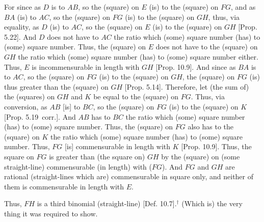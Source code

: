 \begin{Parallel}{}{}
{For since as $D$ is to $AB$, so the (square) on $E$ (is) to the (square)
on $FG$, and as $BA$ (is) to $AC$, so the (square) on $FG$ (is) to
the (square) on $GH$, thus, via equality, as $D$ (is) to $AC$, so the
(square) on $E$ (is) to the (square) on $GH$ [Prop. 5.22]. And $D$ does not have to $AC$ the
ratio which (some) square number (has) to (some) square number.
Thus, the (square) on $E$ does not have to the (square) on $GH$ the ratio
which (some) square number (has) to (some) square number either.
Thus, $E$ is incommensurable in length with $GH$ [Prop. 10.9].  And since as $BA$ is to $AC$,
so the (square) on $FG$ (is) to the (square) on $GH$, the (square) on 
$FG$ (is) thus greater than the (square) on $GH$ [Prop. 5.14]. Therefore, let (the sum of) the (squares)
on $GH$ and $K$
be equal to the (square) on $FG$. Thus, via
conversion, as $AB$ [is] to $BC$, so the (square) on $FG$ (is) to the
(square) on $K$ [Prop. 5.19~corr.]. And $AB$
has to $BC$ the ratio which (some) square number (has) to (some) square
number. Thus, the (square) on $FG$ also has to the (square) on $K$
the ratio which (some) square number (has) to (some) square number.
Thus,  $FG$ [is] commensurable in length with $K$ [Prop. 10.9]. Thus, the square on
$FG$ is greater than (the square on) $GH$ by the (square) on
(some straight-line) commensurable (in length) with ($FG$). And $FG$ and $GH$
are rational (straight-lines which are) commensurable in square only,
and neither of them is commensurable in length with $E$.

Thus, $FH$ is a third binomial (straight-line) [Def. 10.7].$^\dag$ (Which is) the very thing it
was required to show.}
\end{Parallel}



